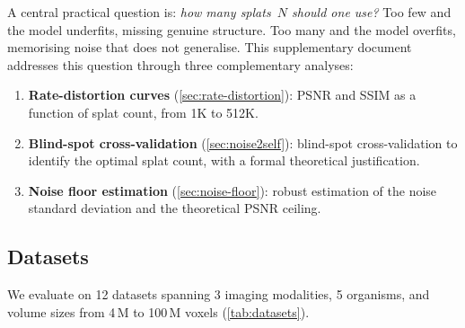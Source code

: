 \documentclass[11pt, a4paper]{article}
\theoremstyle{plain}
\theoremstyle{definition}
\theoremstyle{remark}
\begin{document}
A central practical question is: \emph{how many splats~$N$ should one use?}
Too few and the model underfits, missing genuine structure. Too many and
the model overfits, memorising noise that does not generalise. This
supplementary document addresses this question through three complementary
analyses:

\begin{enumerate}
  \item \textbf{Rate-distortion curves} (\cref{sec:rate-distortion}):
    PSNR and SSIM as a function of splat count, from 1K to 512K.
  \item \textbf{Blind-spot cross-validation} (\cref{sec:noise2self}):
    blind-spot cross-validation to identify the optimal splat count, with
    a formal theoretical justification.
  \item \textbf{Noise floor estimation} (\cref{sec:noise-floor}):
    robust estimation of the noise standard deviation and the theoretical
    PSNR ceiling.
\end{enumerate}

\subsection{Datasets}
\label{sec:datasets}

We evaluate on 12 datasets spanning 3 imaging modalities, 5 organisms,
and volume sizes from 4\,M to 100\,M voxels (\cref{tab:datasets}).
\end{document}
